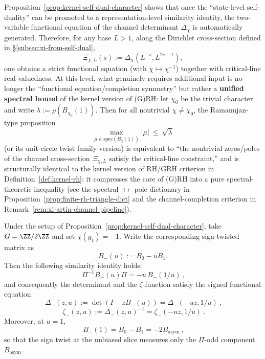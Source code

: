 \begin{remark}\label{rem:kernel-self-dual-character-ramanujan}
Proposition~\ref{prop:kernel-self-dual-character} shows that once the ``state-level self-duality'' can be promoted to a representation-level similarity identity, the two-variable functional equation of the channel determinant \(\Delta_\chi\) is automatically generated.
Therefore, for any base \(L>1\), along the Dirichlet cross-section defined in \S\ref{subsec:xi-from-self-dual},
\[
\Xi_{\chi,L}(s):=\Delta_\chi(L^{-s},L^{2s-1}),
\]
one obtains a strict functional equation (with \(\chi\mapsto\chi^{-1}\)) together with critical-line real-valuedness.
At this level, what genuinely requires additional input is no longer the ``functional equation/completion symmetry'' but rather a \textbf{unified spectral bound} of the kernel version of (G)RH:
let \(\chi_0\) be the trivial character and write \(\lambda:=\rho(B_{\chi_0}(1))\).
Then for all nontrivial \(\chi\neq\chi_0\), the Ramanujan-type proposition
\[
\max_{\mu\in\mathrm{spec}(B_\chi(1))}|\mu|\ \le\ \sqrt{\lambda}
\]
(or its unit-circle twist family version) is equivalent to ``the nontrivial zeros/poles of the channel cross-section \(\Xi_{\chi,L}\) satisfy the critical-line constraint,'' and is structurally identical to the kernel version of RH/GRH criterion in Definition~\ref{def:kernel-rh}: it compresses the core of (G)RH into a pure spectral-theoretic inequality (see the spectral \(\leftrightarrow\) pole dictionary in Proposition~\ref{prop:finite-rh-triangle-dict} and the channel-completion criterion in Remark~\ref{rem:xi-artin-channel-pipeline}).
\end{remark}

\begin{corollary}[Self-dual functional equation for the sign twist \texorpdfstring{$\chi(g_1)=-1$}{chi(g1)=-1} and the ``pure odd part'' readout at \texorpdfstring{$u=1$}{u=1}]\label{cor:kernel-self-dual-sign-twist}
Under the setup of Proposition~\ref{prop:kernel-self-dual-character}, take \(G=\ZZ/2\ZZ\) and set \(\chi(g_1)=-1\).
Write the corresponding sign-twisted matrix as
\[
B_{-}(u):=B_0-uB_1.
\]
Then the following similarity identity holds:
\[
\boxed{\ \Pi^{-1}B_{-}(u)\Pi=-u\,B_{-}(1/u)\ },
\]
and consequently the determinant and the \(\zeta\)-function satisfy the signed functional equation
\[
\boxed{\ \Delta_{-}(z,u):=\det(I-zB_{-}(u))=\Delta_{-}(-uz,1/u)\ },
\]
\[
\boxed{\ \zeta_{-}(z,u):=\Delta_{-}(z,u)^{-1}=\zeta_{-}(-uz,1/u)\ }.
\]
Moreover, at \(u=1\),
\[
\boxed{\ B_{-}(1)=B_0-B_1=-2B_{\mathrm{asym}}\ },
\]
so that the sign twist at the unbiased slice measures only the \(\Pi\)-odd component \(B_{\mathrm{asym}}\).
\end{corollary}

